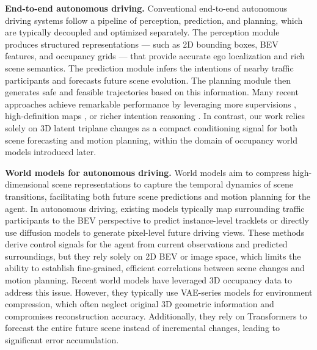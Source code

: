 \documentclass[11pt,a4paper]{article}
\begin{document}
\textbf{End-to-end autonomous driving.}
Conventional end-to-end autonomous driving systems \cite{shengchaohu2022,yihanhu2023} follow a pipeline of perception, prediction, and planning, which are typically decoupled and optimized separately.
The perception module produces structured representations --- such as 2D bounding boxes, BEV features, and occupancy grids --- that provide accurate ego localization and rich scene semantics.
The prediction module infers the intentions of nearby traffic participants and forecasts future scene evolution.
The planning module \cite{zhiqili2024} then generates safe and feasible trajectories based on this information.
Many recent approaches achieve remarkable performance by leveraging more supervisions \cite{wenzhaozheng2024a}, high-definition maps \cite{wenzhaozheng2024a,diwen2024}, or richer intention reasoning \cite{zhilichen2024,yupengzheng2025,diwen2024}.
In contrast, our work relies solely on 3D latent triplane changes as a compact conditioning signal for both scene forecasting and motion planning, within the domain of occupancy world models introduced later.

\textbf{World models for autonomous driving.}
World models \cite{ref0,ref0a} aim to compress high-dimensional scene representations to capture the temporal dynamics of scene transitions, facilitating both future scene predictions and motion planning for the agent.
In autonomous driving, existing models \cite{bojiang2023,yumengzhang2024} typically map surrounding traffic participants to the BEV perspective to predict instance-level tracklets or directly use diffusion models \cite{zehuanwu2024,yuqiwang2024,xiaofengwang2024,shenyuangao2025,fanjia2023} to generate pixel-level future driving views.
These methods derive control signals for the agent from current observations and predicted surroundings, but they rely solely on 2D BEV or image space, which limits the ability to establish fine-grained, efficient correlations between scene changes and motion planning.
Recent world models \cite{julongwei2024,tianshuoxu2025,wenzhaozheng2024,ziyangyan2025,songengu2024} have leveraged 3D occupancy data to address this issue.
However, they typically use VAE-series \cite{aaronvandenoord2017,diederikpkingma2013} models for environment compression, which often neglect original 3D geometric information and compromises reconstruction accuracy.
Additionally, they rely on Transformers \cite{ashishvaswani2017} to forecast the entire future scene instead of incremental changes, leading to significant error accumulation.
\end{document}
